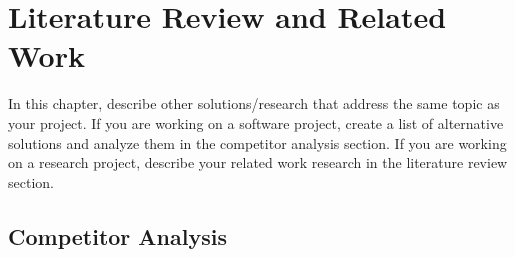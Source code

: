 \chapter{Literature Review and Related Work}
\label{chap:relatedworks}

In this chapter, describe other solutions/research that address the
same topic as your project. If you are working on a software project, create a
list of alternative solutions and analyze them in the competitor analysis section.
If you are working on a research project, describe your related work research in
the literature review section.

\section{Competitor Analysis}
\label{section:competitor-analysis}
